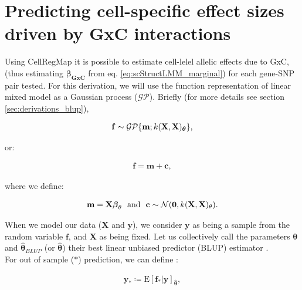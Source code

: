 \section{Predicting cell-specific effect sizes driven by GxC interactions}
\label{sec:beta_gxe}

Using CellRegMap it is possible to estimate cell-lelel allelic effects due to GxC, (thus estimating $\boldsymbol{\beta_{GxC}}$ from eq. \eqref{eq:scStructLMM_marginal}) for each gene-SNP pair tested.
For this derivation, we will use the function representation of linear mixed model as a Gaussian process ($\mathcal{GP}$).
Briefly (for more details see section \ref{sec:derivations_blup}), 


\begin{align}
    \mathbf{f} \sim \mathcal{GP}\{\mathbf{m}; k(\mathbf{X}, \mathbf{X})_{\boldsymbol{\theta}}\},
\end{align}

or:

\begin{align}
    \mathbf{f} = \mathbf{m} + \mathbf{c},
\end{align}

where we define:

\begin{align}
    \mathbf{m} = \mathbf{X} \boldsymbol{\beta}_{\theta}
     \text{~~and~~}
     \mathbf{c} \sim \mathcal N(\mathbf{0}, k(\mathbf{X}, \mathbf{X})_{\theta}). 
\end{align}

When we model our data ($\mathbf{X}$ and $\mathbf{y}$), we consider $\mathbf{y}$ as being a sample from the random variable $\mathbf{f}$, and $\mathbf{X}$ as being fixed.
Let us collectively call the parameters $\boldsymbol{\theta}$ and  $\hat{\boldsymbol{\theta}}_{BLUP}$ (or $\hat{\boldsymbol{\theta}}$) their best linear unbiased predictor (BLUP) estimator \cite{robinson1991blup}. \\

For out of sample ($*$) prediction, we can define \cite{rasmussen2003gaussian}:

\begin{align}
    \mathbf{y}_* \coloneqq \mathrm{E}[\mathbf{f}_* | \mathbf{y}]_{\hat{\boldsymbol{\theta}}},
\end{align}

